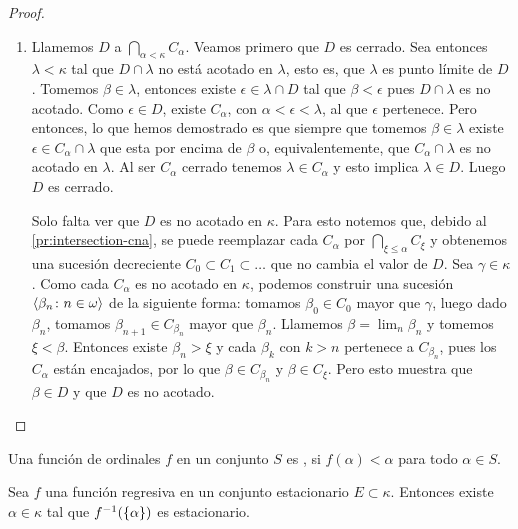 \begin{proof}
\begin{enumerate}[label=\alph*)]
        \item Llamemos $D$ a $\dint_{\alpha<\kappa}C_\alpha$. Veamos primero que $D$ es cerrado.
            Sea entonces $\lambda<\kappa$ tal que $D\cap\lambda$
            no está acotado en $\lambda$, esto es, que $\lambda$ es punto límite de $D$.
            Tomemos $\beta\in\lambda$,
            entonces existe $\epsilon\in\lambda\cap D$ tal que $\beta<\epsilon$ pues
            $D\cap\lambda$ es no acotado.
            Como $\epsilon\in D$, existe $C_\alpha$, con $\alpha<\epsilon<\lambda$,
            al que $\epsilon$ pertenece.
            Pero entonces, lo que hemos demostrado es que siempre que tomemos $\beta\in\lambda$
            existe $\epsilon\in C_\alpha\cap\lambda$ que esta por encima de $\beta$ o, equivalentemente,
            que $C_\alpha\cap\lambda$ es no acotado en $\lambda$.
            Al ser $C_\alpha$ cerrado tenemos $\lambda\in C_\alpha$ y esto implica
            $\lambda\in D$. Luego $D$ es cerrado.

            Solo falta ver que $D$ es no acotado en $\kappa$.
            Para esto notemos que, debido al \cref{pr:intersection-cna},
            se puede reemplazar cada $C_\alpha$ por $\bigcap_{\xi\leq\alpha} C_\xi$
            y obtenemos una sucesión decreciente $C_0\subset C_1\subset\dots$
            que no cambia el valor de $D$.
            Sea $\gamma\in\kappa$. Como cada $C_\alpha$ es no acotado en $\kappa$,
            podemos construir una sucesión $\langle \beta_n\colon n\in\omega \rangle$ de la siguiente forma:
            tomamos $\beta_0\in C_0$ mayor que $\gamma$, luego dado $\beta_n$, tomamos
            $\beta_{n+1} \in C_{\beta_n}$ mayor que $\beta_n$. Llamemos $\beta = \lim_n\beta_n$
            y tomemos $\xi<\beta$. Entonces existe $\beta_n>\xi$ y cada $\beta_k$ con $k>n$
            pertenece a $C_{\beta_n}$, pues los $C_\alpha$ están encajados,
            por lo que $\beta\in C_{\beta_n}$ y $\beta\in C_\xi$.
            Pero esto muestra que $\beta\in D$ y que $D$ es no acotado.
    \end{enumerate}
\end{proof}

\begin{defi}
    Una función de ordinales $f$ en un conjunto $S$ es , si
    $f(\alpha)<\alpha$ para todo $\alpha\in S$.
\end{defi}

\begin{teo}[Fodor]\label{teo:fodor}
    Sea $f$ una función regresiva en un conjunto estacionario $E\subset\kappa$.
    Entonces existe $\alpha\in\kappa$ tal que $f^{-1}(\left\{ \alpha \right\})$ es estacionario.
\end{teo}

